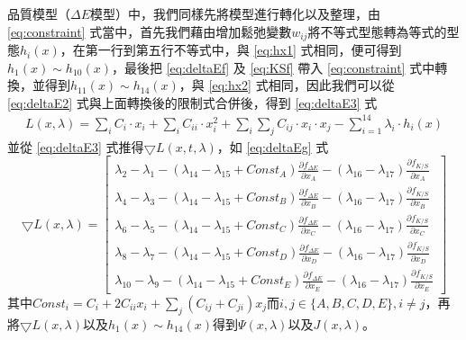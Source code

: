 品質模型（$\Delta E$模型）中，我們同樣先將模型進行轉化以及整理，由 \ref{eq:constraint} 式當中，首先我們藉由增加鬆弛變數$w_{ij}$將不等式型態轉為等式的型態$h_{i}(x)$，在第一行到第五行不等式中，與 \ref{eq:hx1} 式相同，便可得到$h_{1}(x) \sim h_{10}(x)$，最後把 \ref{eq:deltaEf} 及 \ref{eq:KSf} 帶入 \ref{eq:constraint} 式中轉換，並得到$h_{11}(x) \sim h_{14}(x)$，與 \ref{eq:hx2} 式相同，因此我們可以從 \ref{eq:deltaE2} 式與上面轉換後的限制式合併後，得到 \ref{eq:deltaE3} 式
\begin{equation}
	\begin{split}
	L(x,\lambda)=\sum_i C_i\cdot x_i + \sum_i C_{ii}\cdot x_i^2+\sum_i\sum_j C_{ij}\cdot x_{i}\cdot x_{j}-\sum_{i=1}^{14} \lambda_{i}\cdot h_{i}(x)
	\end{split}
\label{eq:deltaE3}
\end{equation}
並從 \ref{eq:deltaE3} 式推得$\bigtriangledown L(x,t,\lambda)$，如 \ref{eq:deltaEg} 式
\begin{equation}
\bigtriangledown L(x,\lambda)=\left[ 
	\begin{array}{c}
	\lambda_{2}-\lambda_{1}-(\lambda_{14}-\lambda_{15}+Const_{A}) \frac{\partial f_{\Delta E}}{\partial x_{A}}-(\lambda_{16}-\lambda_{17}) \frac{\partial f_{K/S}}{\partial x_{A}} \\

	\lambda_{4}-\lambda_{3}-(\lambda_{14}-\lambda_{15}+Const_{B}) \frac{\partial f_{\Delta E}}{\partial x_{B}}-(\lambda_{16}-\lambda_{17}) \frac{\partial f_{K/S}}{\partial x_{B}} \\

	\lambda_{6}-\lambda_{5}-(\lambda_{14}-\lambda_{15}+Const_{C}) \frac{\partial f_{\Delta E}}{\partial x_{C}}-(\lambda_{16}-\lambda_{17}) \frac{\partial f_{K/S}}{\partial x_{C}} \\

	\lambda_{8}-\lambda_{7}-(\lambda_{14}-\lambda_{15}+Const_{D}) \frac{\partial f_{\Delta E}}{\partial x_{D}}-(\lambda_{16}-\lambda_{17}) \frac{\partial f_{K/S}}{\partial x_{D}} \\

	\lambda_{10}-\lambda_{9}-(\lambda_{14}-\lambda_{15}+Const_{E}) \frac{\partial f_{\Delta E}}{\partial x_{E}}-(\lambda_{16}-\lambda_{17}) \frac{\partial f_{K/S}}{\partial x_{E}} 
	\end{array}
	\right]
\label{eq:deltaEg}
\end{equation}
其中$Const_{i}=C_{i}+2C_{ii}x_{i}+\sum_{j} (C_{ij}+C_{ji})x_{j}$而$i,j\in \{A,B,C,D,E\},i\neq j$，再將$\bigtriangledown L(x,\lambda)$以及$h_{1}(x)\sim h_{14}(x)$得到$\Psi(x,\lambda)$以及$J(x,\lambda)$。

